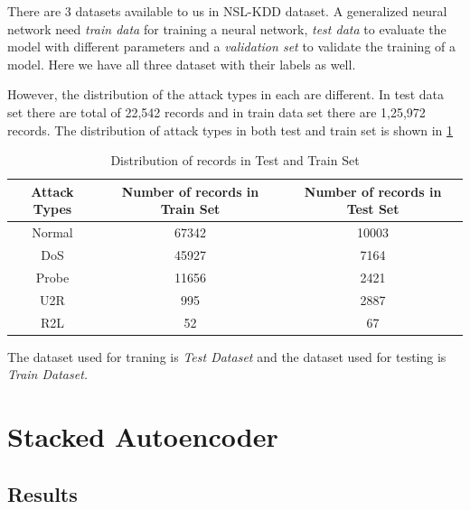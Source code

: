 \documentclass[12pt, a4paper]{report}
\begin{document}
There are 3 datasets available to us in NSL-KDD dataset. A generalized neural network need \textit{train data} for training a neural network, \textit{test data} to evaluate the model with different parameters and a \textit{validation set} to validate the training of a model. Here we have all three dataset with their labels as well.\\ \par

However, the distribution of the attack types in each are different. In test data set there are total of 22,542 records and in train data set there are 1,25,972 records.  
The distribution of attack types in both test and train set is shown in \ref{table:test_train}\\ \par 
\begin{table}[h]
\centering
\begin{tabular}{|c|c|c|}
\hline
\textbf{Attack Types} & \textbf{Number of records in Train Set} & \textbf{Number of records in Test Set} \\ \hline
Normal                & 67342                                   & 10003                                  \\ \hline
DoS                   & 45927                                   & 7164                                   \\ \hline
Probe                 & 11656                                   & 2421                                   \\ \hline
U2R                   & 995                                     & 2887                                   \\ \hline
R2L                   & 52                                      & 67                                     \\ \hline
\end{tabular}
\caption{Distribution of records in Test and Train Set}
\label{table:test_train}
\end{table}

The dataset used for traning is \textit{Test Dataset} and the dataset used for testing is \textit{Train Dataset.}

\section{Stacked Autoencoder}\label{sec:autoencoder}

\subsection{Results}\label{results}
\end{document}
